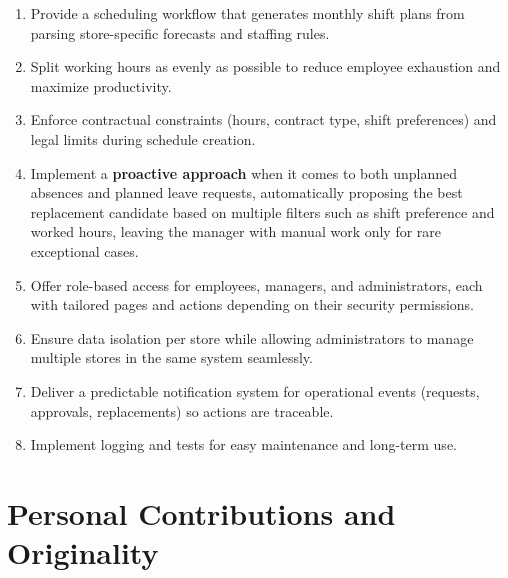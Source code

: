 \begin{enumerate}
    \item Provide a scheduling workflow that generates monthly shift plans from parsing store-specific forecasts and staffing rules.
    \item Split working hours as evenly as possible to reduce employee exhaustion and maximize productivity.
    \item Enforce contractual constraints (hours, contract type, shift preferences) and legal limits during schedule creation.
    \item Implement a \textbf{proactive approach} when it comes to both unplanned absences and planned leave requests, automatically proposing the best replacement candidate based on multiple filters such as shift preference and worked hours, leaving the manager with manual work only for rare exceptional cases.
    \item Offer role-based access for employees, managers, and administrators, each with tailored pages and actions depending on their security permissions.
    \item Ensure data isolation per store while allowing administrators to manage multiple stores in the same system seamlessly.
    \item Deliver a predictable notification system for operational events (requests, approvals, replacements) so actions are traceable.
    \item Implement logging and tests for easy maintenance and long-term use.
\end{enumerate}


\section{Personal Contributions and Originality}

